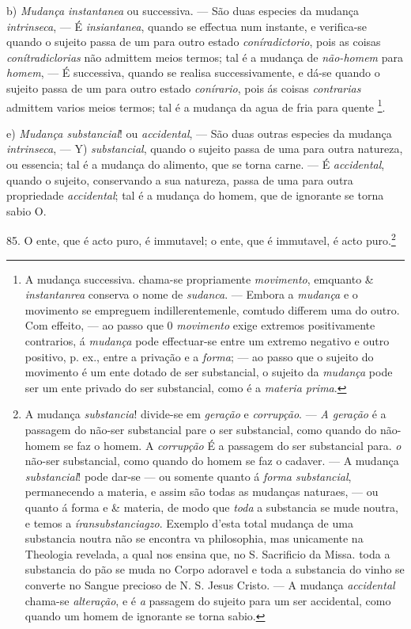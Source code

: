  b) \emph{Mudança instantanea} ou successiva. --- São duas especies da mudança \emph{intrinseca}, --- É \emph{insiantanea}, quando se effectua num instante, e verifica-se quando o sujeito passa de um para outro estado \emph{coníradictorio}, pois as coisas \emph{conítradiclorias} não admittem meios termos; tal é a mudança de \emph{não-homem} para \emph{homem}, --- É successiva, quando se realisa successivamente, e dá-se quando o sujeito passa de um para outro estado \emph{conírario}, pois ás coisas \emph{contrarias} admittem varios meios termos; tal é a mudança da agua de fria para quente \footnote{A mudança successiva. chama-se propriamente \emph{movimento}, emquanto \& \emph{instantanrea} conserva o nome de \emph{sudanca}. --- Embora a \emph{mudança} e o movimento se empreguem indillerentemenle, comtudo differem uma do outro. Com effeito, --- ao passo que 0 \emph{movimento} exige extremos positivamente contrarios, á \emph{mudança} pode effectuar-se entre um extremo negativo e outro positivo, p. ex., entre a privação e a \emph{forma}; --- ao passo que o sujeito do movimento é um ente dotado de ser substancial, o sujeito da \emph{mudança} pode ser um ente privado do ser substancial, como é a \emph{materia prima}.}.

e) \emph{Mudança substancial}! ou \emph{accidental}, --- São duas outras especies da mudança \emph{intrinseca}, --- Y) \emph{substancial}, quando o sujeito passa de uma para outra natureza, ou essencia; tal é a mudança do alimento, que se torna carne. --- É \emph{accidental}, quando o sujeito, conservando a sua natureza, passa de uma para outra propriedade \emph{accidental}; tal é a mudança do homem, que de ignorante se torna sabio O.

85. O ente, que é acto puro, é immutavel; o ente, que é immutavel, é acto puro.\footnote{A mudança \emph{substancia}! divide-se em \emph{geração} e \emph{corrupção}. --- \emph{A geração} é a passagem do não-ser substancial pare o ser substancial, como quando do não-homem se faz o homem. A \emph{corrupção} É a passagem do ser substancial para. \emph{o} não-ser substancial, como quando do homem se faz o cadaver. --- A mudança \emph{substancial}! pode dar-se --- ou somente quanto á \emph{forma substancial}, permanecendo a materia, e assim são todas as mudanças naturaes, --- ou quanto á forma e \& materia, de modo que \emph{toda} a substancia se mude noutra, e temos a \emph{íransubstanciagzo}. Exemplo d'esta total mudança de uma substancia noutra não se encontra va philosophia, mas unicamente na Theologia revelada, a qual nos ensina que, no S. Sacrificio da Missa. toda a substancia do pão se muda no Corpo adoravel e toda a substancia do vinho se converte no Sangue precioso de N. S. Jesus Cristo. --- A mudança \emph{accidental} chama-se \emph{alteração}, e é \emph{a} passagem do sujeito para um ser accidental, como quando um homem de ignorante se torna sabio.}

